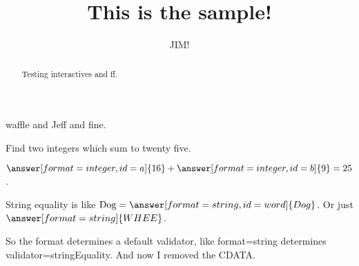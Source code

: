 \documentclass{ximera}
\title{This is the sample!}
\author{JIM!}
\begin{document}
\begin{abstract}
Testing interactives and ff.
\end{abstract}
\maketitle

waffle and Jeff and fine.


\begin{problem}
  \begin{multipleChoice}
  \end{multipleChoice}

  \begin{multipleChoice}[id=mc]
  \end{multipleChoice}

  \begin{multipleChoice}
  \end{multipleChoice}

  \begin{multipleChoice}[id=tf]
  \end{multipleChoice}
\end{problem}

\begin{problem}
  Find two integers which sum to twenty five.

  \begin{validator}[a+b==25]
    $\answer[format=integer,id=a]{16} + \answer[format=integer,id=b]{9} = 25$.
  \end{validator}
\end{problem}

\begin{problem}
  String equality is like $\mbox{Dog} = \answer[format=string,id=word]{Dog}$.  Or just $\answer[format=string]{WHEE}$.

  So the format determines a default validator, like format=string determines validator=stringEquality.  And now I removed the CDATA.
\end{problem}
\end{document}
